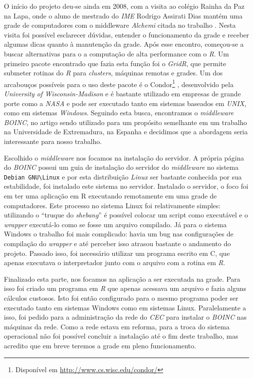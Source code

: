 
O início do projeto deu-se ainda em 2008, com a visita ao colégio Rainha da Paz na Lapa, onde o aluno de mestrado do \textit{IME}
Rodrigo Assirati Dias mantém uma grade de computadores com o middleware \textit{Alchemi} citada no trabalho \cite{Dias}
. Nesta visita foi possível esclarecer dúvidas, entender o funcionamento da grade e receber algumas dicas quanto à manutenção da grade. 
Após esse encontro, começou-se a buscar alternativas para o a computação de alta performance com o \textit{R}. Um primeiro pacote encontrado
que fazia esta função foi o \textit{GridR}, que permite submeter rotinas do \textit{R} para \textit{clusters}, máquinas remotas e 
grades. Um dos arcabouços possíveis para o uso deste pacote é o Condor\footnote{Disponível em \url{http://www.cs.wisc.edu/condor/}}
, desenvolvido pela \textit{University of Wisconsin-Madison} e é bastante utilizado em empresas
de grande porte como a \textit{NASA} e pode ser executado tanto em sistemas
baseados em \textit{UNIX}, como em sistemas \textit{Windows}. Seguindo esta busca, encontramos o 
\textit{middleware} \textit{BOINC}, no artigo \cite{boinc}
sendo utilizado para um propósito semelhante em um trabalho na Universidade de Extremadura, na Espanha 
e decidimos que a abordagem seria interessante para nosso trabalho.

Escolhido o \textit{middleware} nos focamos na instalação do servidor. A própria página do \textit{BOINC} 
possui um guia de instalação do servidor do \textit{middleware} no sistema \verb#Debian GNU\Linux# e por
esta distribuição \textit{Linux} ser bastante conhecida por sua estabilidade, foi instalado este sistema no servidor.
Instalado o servidor, o foco foi em ter uma aplicação em R executando remotamente em uma grade de computadores. 
Este processo no sistema Linux foi relativamente simples: utilizando o ``truque do \textit{shebang}'' é possível 
colocar um script como executável e o \textit{wrapper} executá-lo como se fosse um arquivo compilado. Já para
o sistema Windows %
o trabalho foi mais complicado: havia um bug nas configurações de compilação do \textit{wrapper} e até perceber isso
atrasou bastante o andamento do projeto. Passado isso, foi necessário utilizar um programa escrito em C, que apenas executava 
o interpretador junto com o arquivo com a rotina em \textit{R}.

Finalizado esta parte, nos focamos na aplicação a ser executada na grade. Para isso foi criado um programa em \textit{R} que
apenas acessava um arquivo e fazia alguns cálculos custosos. Isto foi então configurado para o mesmo programa poder
ser executado tanto em sistemas Windows como em sistemas Linux. Paralelamente a isso, foi pedido para a administração
da rede do \textit{CEC} para instalar o \textit{BOINC} nas máquinas da rede. Como a rede estava em reforma, para a troca
do sistema operacional não foi possível concluir a instalação até o fim deste trabalho, mas acredito que em breve teremos a grade em 
pleno funcionamento.


